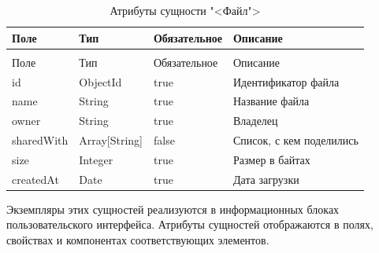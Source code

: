 \begin{xltabular}{\textwidth}{|l|l|p{3.2cm}|X|}
  \caption{Атрибуты сущности "<Файл">\label{files:table}}\\ \hline
  Поле & Тип & Обязательное & Описание \\ \hline
  \endfirsthead
  \\ \hline
  Поле & Тип & Обязательное & Описание \\ \hline
  \endhead
  id & ObjectId & true & Идентификатор файла \\ \hline
  name & String & true & Название файла \\ \hline
  owner & String & true & Владелец \\ \hline
  sharedWith & Array[String] & false & Список, с кем поделились \\ \hline
  size & Integer & true & Размер в байтах \\ \hline
  createdAt & Date & true & Дата загрузки \\ \hline
\end{xltabular}

Экземпляры этих сущностей реализуются в информационных блоках пользовательского интерфейса. Атрибуты сущностей отображаются в полях, свойствах и компонентах соответствующих элементов.
